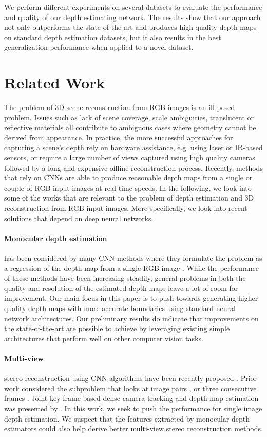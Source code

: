 \documentclass[10pt,twocolumn,letterpaper]{article}
\begin{document}
We perform different experiments on several datasets to evaluate the performance and quality of our depth estimating network. The results show that our approach not only outperforms the state-of-the-art and produces high quality depth maps on standard depth estimation datasets, but it also results in the best generalization performance when applied to a novel dataset.


\section{Related Work}

The problem of 3D scene reconstruction from RGB images is an ill-posed problem. Issues such as lack of scene coverage, scale ambiguities, translucent or reflective materials all contribute to ambiguous cases where geometry cannot be derived from appearance. In practice, the more successful approaches for capturing a scene's depth rely on hardware assistance, e.g. using laser or IR-based sensors, or require a large number of views captured using high quality cameras followed by a long and expensive offline reconstruction process. Recently, methods that rely on CNNs are able to produce reasonable depth maps from a single or couple of RGB input images at real-time speeds. In the following, we look into some of the works that are relevant to the problem of depth estimation and 3D reconstruction from RGB input images. More specifically, we look into recent solutions that depend on deep neural networks.

\paragraph{Monocular depth estimation} has been considered by many CNN methods where they formulate the problem as a regression of the depth map from a single RGB image \cite{Eigen2014,Laina2016,Xu2017,Hao2018DetailPD,Xu2018StructuredAG,Fu2018DeepOR}. While the performance of these methods have been increasing steadily, general problems in both the quality and resolution of the estimated depth maps leave a lot of room for improvement. Our main focus in this paper is to push towards generating higher quality depth maps with more accurate boundaries using standard neural network architectures. Our preliminary results do indicate that improvements on the state-of-the-art are possible to achieve by leveraging existing simple architectures that perform well on other computer vision tasks.

\paragraph{Multi-view} stereo reconstruction using CNN algorithms have been recently proposed \cite{Huang2018DeepMVSLM}. Prior work considered the subproblem that looks at image pairs \cite{Ummenhofer2017}, or three consecutive frames \cite{Godard2018DiggingIS}. Joint key-frame based dense camera tracking and depth map estimation was presented by \cite{Zhou2018DeepTAMDT}. In this work, we seek to push the performance for single image depth estimation. We suspect that the features extracted by monocular depth estimators could also help derive better multi-view stereo reconstruction methods.
\end{document}
